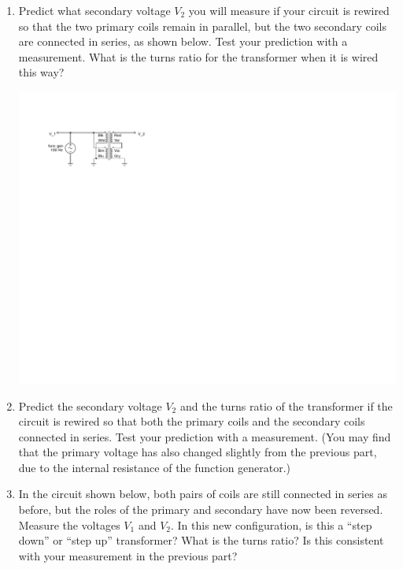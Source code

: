 \begin{enumerate}[wide]
\item Predict what secondary voltage $V_2$ you will measure if your circuit is rewired so that the two primary coils remain in parallel, but the two secondary coils are connected in series, as shown below.  Test your prediction with a measurement.  What is the turns ratio for the transformer when it is wired this way?

\begin{center}
\includegraphics{transformers/transformer_par_ser.pdf}
\end{center}

\item Predict the secondary voltage $V_2$ and the turns ratio of the transformer if the circuit is rewired so that both the primary coils and the secondary coils connected in series. Test your prediction with a measurement.  (You may find that the primary voltage has also changed slightly from the previous part, due to the internal resistance of the function generator.)

\item In the circuit shown below, both pairs of coils are still connected in series as before, but the roles of the primary and secondary have now been reversed.  Measure the voltages $V_1$ and $V_2$.  In this new configuration, is this a ``step down'' or ``step up'' transformer?  What is the turns ratio?  Is this consistent with your measurement in the previous part? 


\end{enumerate}
